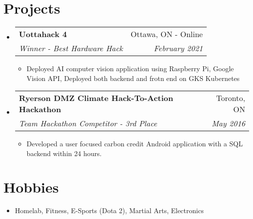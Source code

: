 \documentclass[letterpaper,11pt]{article}
\makeatletter
\newcommand{\resumeItem}[2]{
  \item\small{
    \textbf{#1}{#2 \vspace{-2pt}}
  }
}
\newcommand{\resumeSubheading}[4]{
  \vspace{-1pt}\item
    \begin{tabular*}{0.97\textwidth}[t]{l@{\extracolsep{\fill}}r}
      \textbf{#1} & #2 \\
      \textit{\small#3} & \textit{\small #4} \\
    \end{tabular*}\vspace{-5pt}
}
\newcommand{\resumeSubSubheading}[2]{
    \begin{tabular*}{0.97\textwidth}{l@{\extracolsep{\fill}}r}
      \textit{\small#1} & \textit{\small #2} \\
    \end{tabular*}\vspace{-5pt}
}
\newcommand{\resumeSubHeadingListStart}{\begin{itemize}[leftmargin=*]}
\newcommand{\resumeSubHeadingListEnd}{\end{itemize}}
\newcommand{\resumeItemListStart}{\begin{itemize}}
\newcommand{\resumeItemListEnd}{\end{itemize}\vspace{-5pt}}
\makeatother
\begin{document}
      


\section{Projects}
  \resumeSubHeadingListStart
	\resumeSubheading
	{Uottahack 4}{Ottawa, ON - Online}
	{Winner - Best Hardware Hack}{February 2021}
		\resumeItemListStart
			\resumeItem{}
			{Deployed AI computer vision application using Raspberry Pi, Google Vision API,
      Deployed both backend and frotn end on GKS Kubernetes}
		\resumeItemListEnd
\resumeSubheading
	{Ryerson DMZ Climate Hack-To-Action Hackathon}{Toronto, ON}
	{Team Hackathon Competitor - 3rd Place }{May 2016}
		\resumeItemListStart
			\resumeItem{}
			{Developed a user focused carbon credit Android application with a SQL backend within 24 hours.}
		\resumeItemListEnd
    
  \resumeSubHeadingListEnd

\section{Hobbies}
	\resumeSubHeadingListStart
	\item{
	\textbf{}{Homelab, Fitness, E-Sports (Dota 2), Martial Arts, Electronics}
	}
	\resumeSubHeadingListEnd
  
\end{document}

